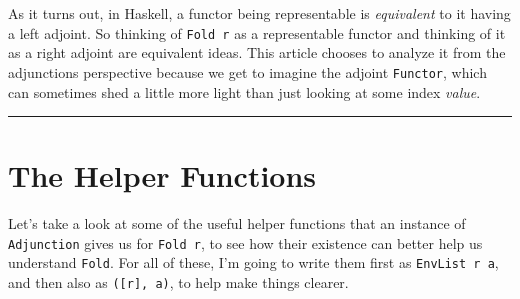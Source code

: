 \documentclass[]{article}
\begin{document}
As it turns out, in Haskell, a functor being representable is \emph{equivalent}
to it having a left adjoint. So thinking of \texttt{Fold\ r} as a representable
functor and thinking of it as a right adjoint are equivalent ideas. This article
chooses to analyze it from the adjunctions perspective because we get to imagine
the adjoint \texttt{Functor}, which can sometimes shed a little more light than
just looking at some index \emph{value}.

\begin{center}\rule{0.5\linewidth}{\linethickness}\end{center}

\hypertarget{the-helper-functions}{%
\section{The Helper Functions}\label{the-helper-functions}}

Let's take a look at some of the useful helper functions that an instance of
\texttt{Adjunction} gives us for \texttt{Fold\ r}, to see how their existence
can better help us understand \texttt{Fold}. For all of these, I'm going to
write them first as \texttt{EnvList\ r\ a}, and then also as
\texttt{({[}r{]},\ a)}, to help make things clearer.
\end{document}
